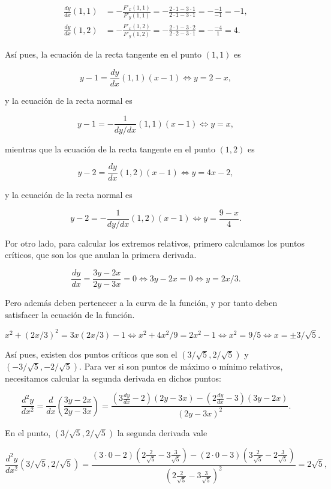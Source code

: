 \documentclass[
  a4paper,
]{scrreport}
\theoremstyle{definition}
\theoremstyle{remark}
\begin{document}
\begin{tcolorbox}
\begin{align*}
\frac{dy}{dx}(1,1) 
&= -\frac{F'_x(1,1)}{F'_y(1,1)} 
= -\frac{2\cdot 1-3\cdot 1}{2\cdot 1-3\cdot 1} 
= -\frac{-1}{-1} 
= -1,\\
\frac{dy}{dx}(1,2) 
&= -\frac{F'_x(1,2)}{F'_y(1,2)} 
= -\frac{2\cdot 1-3\cdot 2}{2\cdot 2-3\cdot 1} 
= -\frac{-4}{1} 
= 4.
\end{align*}

Así pues, la ecuación de la recta tangente en el punto \((1,1)\) es

\[
y-1 = \frac{dy}{dx}(1,1)(x-1) \Leftrightarrow y= 2-x,
\]

y la ecuación de la recta normal es

\[
y-1 = -\frac{1}{dy/dx}(1,1)(x-1) \Leftrightarrow y= x,
\]

mientras que la ecuación de la recta tangente en el punto \((1,2)\) es

\[
y-2 = \frac{dy}{dx}(1,2)(x-1) \Leftrightarrow y= 4x-2,
\]

y la ecuación de la recta normal es

\[
y-2 = -\frac{1}{dy/dx}(1,2)(x-1) \Leftrightarrow y=\frac{9-x}{4}.
\]

Por otro lado, para calcular los extremos relativos, primero calculamos
los puntos críticos, que son los que anulan la primera derivada.

\[
\frac{dy}{dx}=\frac{3y-2x}{2y-3x}=0 \Leftrightarrow 3y-2x=0 \Leftrightarrow y=2x/3.
\]

Pero además deben pertenecer a la curva de la función, y por tanto deben
satisfacer la ecuación de la función.

\[
x^{2}+(2x/3)^{2}=3x(2x/3)-1 \Leftrightarrow x^{2}+4x^{2}/9 = 2x^{2}-1 \Leftrightarrow x^{2}=9/5 \Leftrightarrow x=\pm 3/\sqrt{5}.
\]

Así pues, existen dos puntos críticos que son el
\((3/\sqrt{5},2/\sqrt{5})\) y \((-3/\sqrt{5},-2/\sqrt{5})\). Para ver si
son puntos de máximo o mínimo relativos, necesitamos calcular la segunda
derivada en dichos puntos:

\[
\frac{d^{2}y}{dx^{2}} = \frac{d}{dx}\left(\frac{3y-2x}{2y-3x}\right) = \frac{(3\frac{dy}{dx}-2)(2y-3x)-(2\frac{dy}{dx}-3)(3y-2x)}{(2y-3x)^{2}}.
\]

En el punto, \((3/\sqrt{5},2/\sqrt{5})\) la segunda derivada vale

\[
\frac{d^{2}y}{dx^{2}}(3/\sqrt{5},2/\sqrt{5})=
\frac{(3\cdot 0-2)(2\frac{2}{\sqrt{5}}-3\frac{3}{\sqrt{5}})-(2\cdot 0-3)(3\frac{2}{\sqrt{5}}-2\frac{3}{\sqrt{5}})}{(2\frac{2}{\sqrt{5}}-3\frac{3}{\sqrt{5}})^{2}} = 2\sqrt{5},
\]


\end{tcolorbox}
\end{document}
